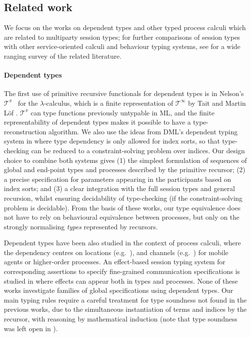 \documentclass{LMCS}
\begin{document}
\subsection{Related work}
We focus on the works on dependent types and other typed process
calculi which are related to multiparty session types; for further
comparisons of session types with other service-oriented calculi and
behaviour typing systems, see \cite{DL10} for a wide ranging survey of
the related literature.

\paragraph*{\bf Dependent types}
\noindent
The first use of primitive recursive functionals for dependent types
is in Nelson's $\mathcal{T}^\pi$~\cite{DBLP:conf/mfps/Nelson91}
for the $\lambda$-calculus, which is a finite
representation of $\mathcal{T}^\infty$ by Tait and Martin L\"of
\cite{Tait,PerMartin}.
$\mathcal{T}^\pi$ can type functions previously untypable in ML, and the finite
representability of dependent types makes it possible to have a
type-reconstruction algorithm. We also use the ideas from DML's
dependent typing system in \cite{DBLP:conf/popl/XiP99,DependentBook}
where type dependency is only allowed for index sorts, so that
type-checking can be reduced to a constraint-solving problem over
indices.
Our design choice to combine both systems gives (1) the simplest formulation of sequences of global and end-point types and
processes described by the primitive recursor; (2) a precise specification
for parameters appearing in the participants based on index sorts; and (3) a
clear
integration with the full session types
and general recursion, whilst ensuring decidability of type-checking (if the
constraint-solving problem is decidable).
From the basis of these works,
our type equivalence
does not have to rely on
behavioural equivalence between processes, but only on the strongly
normalising {\em types} represented by recursors.

Dependent types have been also studied in the context
of process calculi, where the dependency centres
on locations (e.g.~\cite{Hennessy07}),
and channels (e.g.~\cite{Yoshida04}) for mobile agents or
higher-order processes.
An effect-based session typing system
for corresponding assertions to specify fine-grained
communication specifications is studied
in \cite{BAG05} where effects can appear both in types and
processes.
None of these works investigate families of global specifications using
dependent types.
Our main typing rules require a careful treatment for type
soundness not found in the previous works, due to the simultaneous instantiation
of terms and indices by the recursor, with reasoning by mathematical induction
(note that type soundness was left open in \cite{DBLP:conf/mfps/Nelson91}).
\end{document}

